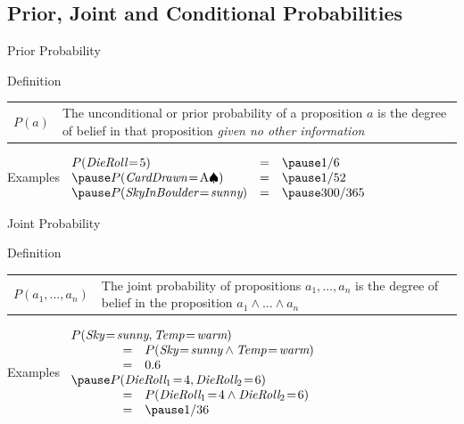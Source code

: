 \documentclass[14pt]{beamer}
\begin{document}
\subsection{Prior, Joint and Conditional Probabilities}
\begin{frame}{Prior Probability}
	\begin{block}{Definition}
		\begin{tabular}{lm{3.5in}}
			\large $P(a)$
			&
			The \alert{unconditional} or \alert{prior probability} of a proposition $a$ is the degree of belief in that proposition \emph{given no other information}
		\end{tabular}
	\end{block}
	\pause
	\begin{block}{Examples}
		$
		\begin{array}{lll}
			P(\textit{DieRoll} \!=\! 5)                    & = & \pause 1/6 \\
			\pause
			P(\textit{CardDrawn} \!=\! \mbox{A}\spadesuit) & = & \pause 1/52 \\
			\pause
			P(\textit{SkyInBoulder} \!=\! \textit{sunny})      & = & \pause 300/365
		\end{array}
		$
	\end{block}
\end{frame}
\begin{frame}{Joint Probability}
	\begin{block}{Definition}
		\begin{tabular}{lm{2.75in}}
			\large $P(a_1, \ldots, a_n)$
			&
			The \alert{joint probability} of propositions $a_1, \ldots, a_n$ is the degree of belief in the proposition $a_1 \land \ldots \land a_n$
		\end{tabular}
	\end{block}
	\pause
	\begin{block}{Examples}
		$
		\begin{array}{lll}
			\lefteqn{P(\textit{Sky} \!=\! \textit{sunny}, \textit{Temp} \!=\! \textit{warm})} \\
			& = & P(\textit{Sky} \!=\! \textit{sunny} \land \textit{Temp} \!=\! \textit{warm}) \\
			& = & 0.6 \\
			\pause
			\lefteqn{P(\textit{DieRoll}_1 \!=\! 4, \textit{DieRoll}_2 \!=\! 6)} \\
			& = & P(\textit{DieRoll}_1 \!=\! 4 \land \textit{DieRoll}_2 \!=\! 6) \\
			& = & \pause 1/36 \\
		\end{array}
		$
	\end{block}
\end{frame}
\end{document}
